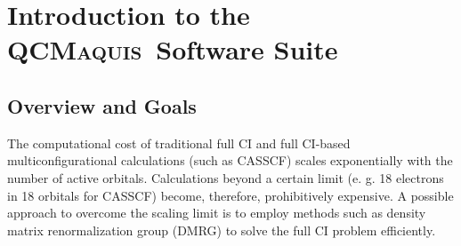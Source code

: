 \documentclass[bibliography=totoc,12pt,a4paper]{scrartcl}
\newcommand{\mol}{\textsc{OpenMolcas}}
\newcommand{\qcm}{\textsc{QCMaquis}}
\newcommand{\hostp}{\mol}
\begin{document}
%
%
%
%
%



\clearpage


\tableofcontents
\clearpage



\section{Introduction to the \qcm\ Software Suite}

\subsection{Overview and Goals}

The computational cost of traditional full CI and full CI-based multiconfigurational calculations (such as CASSCF) scales exponentially with the number of active orbitals.
Calculations beyond a certain limit (e. g. 18 electrons in 18 orbitals for CASSCF) become, therefore, prohibitively expensive. 
A possible approach to overcome the scaling limit is to employ methods such as density matrix renormalization group (DMRG) \cite{Schollwock_AnnPhys_densitymatrix_2011,Marti_ZPhysChem_Density_2010,Chan2011,Chan_JChemPhys_Matrix_2016,Baiardi2020_Review} to solve the full CI problem efficiently.
\end{document}
